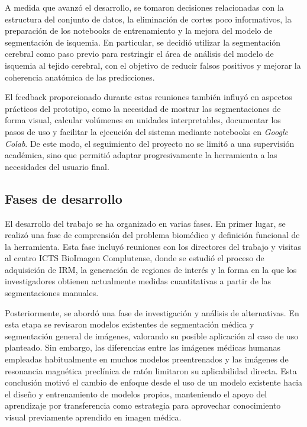 A medida que avanzó el desarrollo, se tomaron decisiones relacionadas con la estructura del conjunto de datos, la eliminación de cortes poco informativos, la preparación de los notebooks de entrenamiento y la mejora del modelo de segmentación de isquemia. En particular, se decidió utilizar la segmentación cerebral como paso previo para restringir el área de análisis del modelo de isquemia al tejido cerebral, con el objetivo de reducir falsos positivos y mejorar la coherencia anatómica de las predicciones.

El feedback proporcionado durante estas reuniones también influyó en aspectos prácticos del prototipo, como la necesidad de mostrar las segmentaciones de forma visual, calcular volúmenes en unidades interpretables, documentar los pasos de uso y facilitar la ejecución del sistema mediante notebooks en \textit{Google Colab}. De este modo, el seguimiento del proyecto no se limitó a una supervisión académica, sino que permitió adaptar progresivamente la herramienta a las necesidades del usuario final.

\subsection{Fases de desarrollo}

El desarrollo del trabajo se ha organizado en varias fases. En primer lugar, se realizó una fase de comprensión del problema biomédico y definición funcional de la herramienta. Esta fase incluyó reuniones con los directores del trabajo y visitas al centro ICTS BioImagen Complutense, donde se estudió el proceso de adquisición de IRM, la generación de regiones de interés y la forma en la que los investigadores obtienen actualmente medidas cuantitativas a partir de las segmentaciones manuales.

Posteriormente, se abordó una fase de investigación y análisis de alternativas. En esta etapa se revisaron modelos existentes de segmentación médica y segmentación general de imágenes, valorando su posible aplicación al caso de uso planteado. Sin embargo, las diferencias entre las imágenes médicas humanas empleadas habitualmente en muchos modelos preentrenados y las imágenes de resonancia magnética preclínica de ratón limitaron su aplicabilidad directa. Esta conclusión motivó el cambio de enfoque desde el uso de un modelo existente hacia el diseño y entrenamiento de modelos propios, manteniendo el apoyo del aprendizaje por transferencia como estrategia para aprovechar conocimiento visual previamente aprendido en imagen médica.

